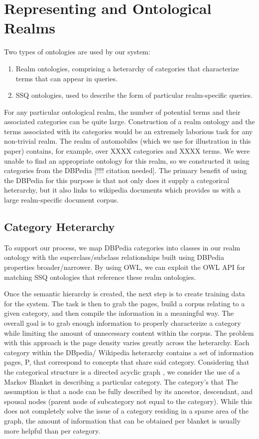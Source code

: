 \section{Representing and Ontological Realms}
Two types of ontologies are used by our system:
\begin{enumerate}
\item Realm ontologies, comprising a heterarchy of categories that
  characterize terms that can appear in queries.
\item SSQ ontologies, used to describe the form of particular
  realm-specific queries.
\end{enumerate}
For any particular ontological realm, the number of potential
terms and their associated categories can be quite large.
Construction of a realm ontology and the terms associated
with its categories would be an extremely laborious task
for any non-trivial realm. The realm of automobiles (which
we use for illustration in this paper) contains, for example,
over XXXX categories and XXXX terms. We were unable to find
an appropriate ontology for this realm, so we constructed it
using categories from the DBPedia [!!!! citation needed].
The primary benefit of using the DBPedia for this purpose is
that not only does it supply a categorical heterarchy, but it
also links to wikipedia documents which provides us with a large
realm-specific document corpus.
\subsection{Category Heterarchy} 

To support our process, we map DBPedia categories into classes in our
realm ontology with the superclass/subclass relationships built using
DBPedia properties broader/narrower.  By using OWL, we can exploit the
OWL API for matching SSQ ontologies that reference these realm
ontologies.


Once the semantic hierarchy is created, the next step is to create
training data for the system. The task is then to grab the pages,
build a corpus relating to a given category, and then compile the
information in a meaningful way. The overall goal is to grab enough
information to properly characterize a category while limiting the
amount of unnecessary content within the corpus. The problem with this
approach is the page density varies greatly across the
heterarchy. Each category within the DBpedia/ Wikipedia heterarchy
contains a set of information pages, P, that correspond to concepts
that share said category. Considering that the categorical structure
is a directed acyclic graph \cite{Suchanek07yago:a}, we consider the
use of a Markov Blanket \cite{Friedman97bayesiannetwork} in describing
a particular category. The category's that The assumption is that a
node can be fully described by its ancestor, descendant, and spousal
nodes (parent node of subcategory not equal to the category). While
this does not completely solve the issue of a category residing in a
sparse area of the graph, the amount of information that can be
obtained per blanket is usually more helpful than per category.


